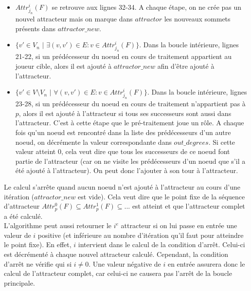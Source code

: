 \documentclass[12pt,a4paper,oneside,titlepage]{report}
\begin{document}
\begin{itemize}
\item $Attr^i_{j_n}(F)$ se retrouve aux lignes 32-34. A chaque étape, on ne crée pas un nouvel attracteur mais on marque dans $attractor$ les nouveaux sommets présents dans $attractor\_new$.
\item $\{v'\in V_n$ $|$ $\exists(v,v')\in E:v\in Attr^i_{j_n}(F)\}$. Dans la boucle intérieure, lignes 21-22, si un prédécesseur du noeud en cours de traitement appartient au joueur cible, alors il est ajouté à $attractor\_new$ afin d'être ajouté à l'attracteur.
\item $\{v'\in V\setminus V_n$ $|$ $\forall(v,v')\in E:v\in Attr^i_{j_n}(F)\}$. Dans la boucle intérieure, lignes 23-28, si un prédécesseur du noeud en cours de traitement n'appartient pas à $p$, alors il est ajouté à l'attracteur si tous ses successeurs sont aussi dans l'attracteur. C'est à cette étape que le pré-traitement joue un rôle. A chaque fois qu'un noeud est rencontré dans la liste des prédécesseurs d'un autre noeud, on décrémente la valeur correspondante dans $out\_degrees$. Si cette valeur atteint $0$, cela veut dire que tous les successeurs de ce noeud font partie de l'attracteur (car on ne visite les prédécesseurs d'un noeud que s'il a été ajouté à l'attracteur). On peut donc l'ajouter à son tour à l'attracteur.
\end{itemize}
Le calcul s'arrête quand aucun noeud n'est ajouté à l'attracteur au cours d'une itération ($attractor\_new$ est vide). Cela veut dire que le point fixe de la séquence d'attracteur $Attr^0_p(F)\subseteq Attr^1_p(F)\subseteq ...$ est atteint et que l'attracteur complet a été calculé.\\
L'algorithme peut aussi retourner le $i^e$ attracteur si on lui passe en entrée une valeur de $i$ positive (et inférieure au nombre d'itération qu'il faut pour atteindre le point fixe). En effet, $i$ intervient dans le calcul de la condition d'arrêt. Celui-ci est décrémenté à chaque nouvel attracteur calculé. Cependant, la condition d'arrêt ne vérifie qui si $i\neq 0$. Une valeur négative de $i$ en entrée assurera donc le calcul de l'attracteur complet, car celui-ci ne causera pas l'arrêt de la boucle principale.
\end{document}
